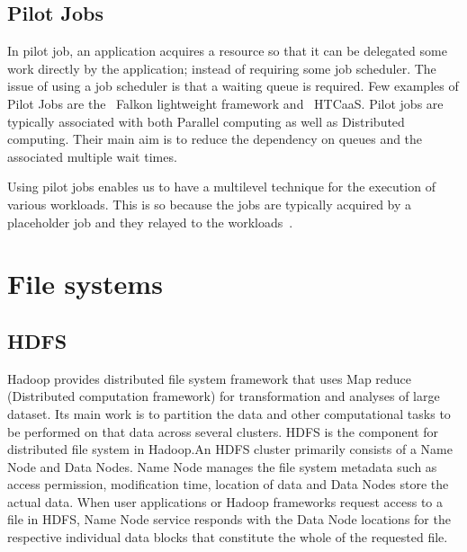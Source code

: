      \pv

\subsection{Pilot Jobs}

In pilot job, an application acquires a resource so that it can be
delegated some work directly by the application; instead of requiring
some job scheduler. The issue of using a job scheduler is that a
waiting queue is required. Few examples of Pilot Jobs are
the~\cite{pilot-job-falkon-paper-2007} Falkon lightweight framework
and~\cite{pilot-job-htcaas-paper-2007} HTCaaS. Pilot jobs are
typically associated with both Parallel computing as well as
Distributed computing. Their main aim is to reduce the dependency on
queues and the associated multiple wait times.

Using pilot jobs enables us to have a multilevel technique for the
execution of various workloads. This is so because the jobs are
typically acquired by a placeholder job and they relayed to the
workloads~\cite{www-pilot-job-paper-2016}.

\section{File systems}
\label{S:o-file-systems}


\subsection{HDFS}
     
     Hadoop provides distributed file system framework that uses Map
     reduce (Distributed computation framework) for transformation and
     analyses of large dataset.  Its main work is to partition the
     data and other computational tasks to be performed on that data
     across several clusters.  HDFS is the component for distributed
     file system in Hadoop.An HDFS cluster primarily consists of a
     Name Node and Data Nodes. Name Node manages the file system
     metadata such as access permission, modification time, location
     of data and Data Nodes store the actual data.   When user
     applications or Hadoop frameworks request access to a file in
     HDFS, Name Node service responds with the Data Node locations for
     the respective individual data blocks that constitute the whole
     of the requested file\cite{www-hdfs}.

